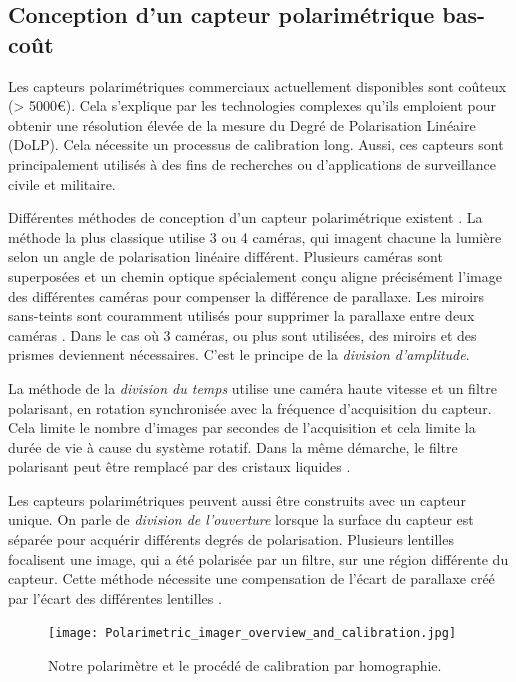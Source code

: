 \subsection{Conception d'un capteur polarimétrique bas-coût}
Les capteurs polarimétriques commerciaux actuellement disponibles sont coûteux (> 5000€).
Cela s'explique par les technologies complexes qu'ils emploient pour obtenir une résolution élevée de la mesure du Degré de Polarisation Linéaire (DoLP).
Cela nécessite un processus de calibration long.
Aussi, ces capteurs sont principalement utilisés à des fins de recherches ou d'applications de surveillance civile et militaire.

Différentes méthodes de conception d'un capteur polarimétrique existent \cite{tyo_review_2006}.
La méthode la plus classique utilise 3 ou 4 caméras, qui imagent chacune la lumière selon un angle de polarisation linéaire différent.
Plusieurs caméras sont superposées et un chemin optique spécialement conçu aligne précisément l'image des différentes caméras pour compenser la différence de parallaxe.
Les miroirs sans-teints sont couramment utilisés pour supprimer la parallaxe entre deux caméras \cite{wolff_polarization_1995}.
Dans le cas où 3 caméras, ou plus sont utilisées, des miroirs et des prismes deviennent nécessaires.
C'est le principe de la \textit{division d'amplitude}.

La méthode de la \textit{division du temps} utilise une caméra haute vitesse et un filtre polarisant, en rotation synchronisée avec la fréquence d'acquisition du capteur.
Cela limite le nombre d'images par secondes de l'acquisition et cela limite la durée de vie à cause du système rotatif.
Dans la même démarche, le filtre polarisant peut être remplacé par des cristaux liquides \cite{gendre_full_2011}.

Les capteurs polarimétriques peuvent aussi être construits avec un capteur unique.
On parle de \textit{division de l'ouverture} lorsque la surface du capteur est séparée pour acquérir différents degrés de polarisation.
Plusieurs lentilles focalisent une image, qui a été polarisée par un filtre, sur une région différente du capteur.
Cette méthode nécessite une compensation de l'écart de parallaxe créé par l'écart des différentes lentilles \cite{riou_calibration_2015}.  %

\begin{figure}[bht]
	\centering
	\texttt{[image: Polarimetric\_imager\_overview\_and\_calibration.jpg]}
	\caption{Notre polarimètre et le procédé de calibration par homographie.}
	\label{fig:sensor}
\end{figure}

